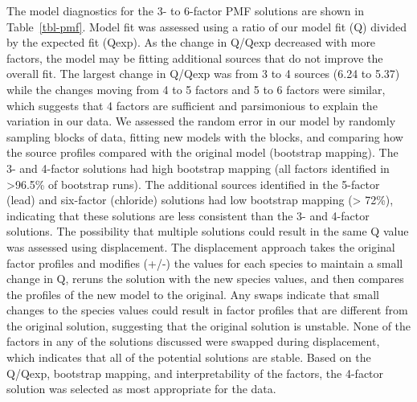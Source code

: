 \documentclass[
  letterpaper,
  DIV=11,
  numbers=noendperiod]{scrartcl}
\begin{document}
The model diagnostics  for the 3- to 6-factor PMF
solutions are shown in Table~\ref{tbl-pmf}. Model fit was assessed using
a ratio of our model fit (Q) divided by the expected fit (Qexp). As the
change in Q/Qexp decreased with more factors, the model may be fitting
additional sources that do not improve the overall fit. The largest
change in Q/Qexp was from 3 to 4 sources (6.24 to 5.37) while the
changes moving from 4 to 5 factors and 5 to 6 factors were similar,
which suggests that 4 factors are sufficient and parsimonious to explain
the variation in our data. We assessed the random error in our model by
randomly sampling blocks of data, fitting new models with the blocks,
and comparing how the source profiles compared with the original model
(bootstrap mapping). The 3- and 4-factor solutions had high bootstrap
mapping (all factors identified in \textgreater96.5\% of bootstrap
runs). The additional sources identified in the 5-factor (lead) and
six-factor (chloride) solutions had low bootstrap mapping
(\textgreater{} 72\%), indicating that these solutions are less
consistent than the 3- and 4-factor solutions. The possibility that
multiple solutions could result in the same Q value was assessed using
displacement. The displacement approach takes the original factor
profiles and modifies (+/-) the values for each species to maintain a
small change in Q, reruns the solution with the new species values, and
then compares the profiles of the new model to the original. Any swaps
indicate that small changes to the species values could result in factor
profiles that are different from the original solution, suggesting that
the original solution is unstable. None of the factors in any of the
solutions discussed were swapped during displacement, which indicates
that all of the potential solutions are stable. Based on the Q/Qexp,
bootstrap mapping, and interpretability of the factors, the 4-factor
solution was selected as most appropriate for the data.
\end{document}
